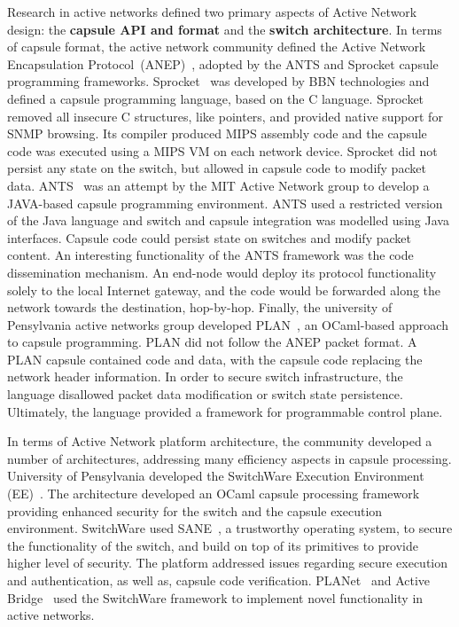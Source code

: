 Research in active networks defined two primary aspects of Active Network
design: the {\bf capsule API and format} and the {\bf switch architecture}. In
terms of capsule format, the active network community defined the Active Network
Encapsulation Protocol~(ANEP)~, adopted by the ANTS and
Sprocket capsule programming frameworks.  Sprocket~ was
developed by BBN technologies and defined a capsule programming language, based
on the C language. Sprocket removed all insecure C structures, like pointers,
and provided native support for SNMP browsing.  Its compiler produced MIPS
assembly code and the capsule code was executed using a MIPS VM on each network
device.  Sprocket did not persist any state on the switch, but allowed in
capsule code to modify packet data.  ANTS~ was an attempt
by the MIT Active Network group to develop a JAVA-based capsule programming
environment.  ANTS used a restricted version of the Java language and switch and
capsule integration was modelled using Java interfaces. Capsule code could
persist state on switches and modify packet content. An interesting
functionality of the ANTS framework was the code dissemination mechanism. An
end-node would deploy its protocol functionality solely to the local Internet
gateway, and the code would be forwarded along the network towards the
destination, hop-by-hop. Finally, the university of Pensylvania active networks
group developed PLAN~, an OCaml-based approach to capsule
programming.  PLAN did not follow the ANEP packet format. A PLAN capsule
contained code and data, with the capsule code replacing the network header
information. In order to secure switch infrastructure, the language disallowed
packet data modification or switch state persistence.  Ultimately, the language
provided a framework for programmable control plane.

In terms of Active Network platform architecture, the community developed a
number of architectures, addressing many efficiency aspects in capsule
processing. University of Pensylvania developed the SwitchWare Execution
Environment (EE)~.  The architecture developed an OCaml
capsule processing framework providing enhanced security for the switch and the
capsule execution environment.  SwitchWare used SANE~, a
trustworthy operating system, to secure the functionality of the switch, and
build on top of its primitives to provide higher level of security. The platform
addressed issues regarding secure execution and authentication, as well as,
capsule code verification.  PLANet~ and Active
Bridge~ used the SwitchWare framework to implement novel
functionality in active networks. 

